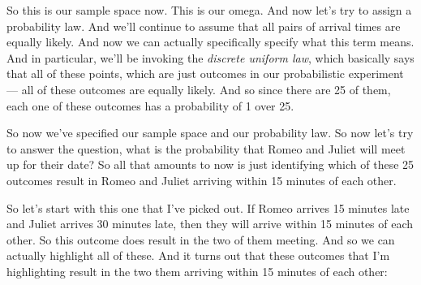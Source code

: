 \documentclass[pdftex, brazil, 12pt, twoside]{article}
\begin{document}
\begin{figure}[H]
  \begin{center}
  \end{center}
\end{figure}

So this is our sample space now.
This is our omega.
And now let's try to assign a probability law.
And we'll continue to assume that all pairs of arrival 
times are equally likely.
And now we can actually specifically specify what this
term means.
And in particular, we'll be invoking the \emph{discrete uniform
law}, which basically says that all of these points, which are
just outcomes in our probabilistic experiment ---
all of these outcomes are equally likely.
And so since there are 25 of them, each one of these
outcomes has a probability of 1 over 25.

So now we've specified our sample space and our
probability law.
So now let's try to answer the question, what is the
probability that Romeo and Juliet will meet
up for their date?
So all that amounts to now is just identifying which of
these 25 outcomes result in Romeo and Juliet arriving
within 15 minutes of each other.

So let's start with this one that I've picked out.
If Romeo arrives 15 minutes late and Juliet arrives 30
minutes late, then they will arrive within 15 minutes of
each other.
So this outcome does result in the two of them meeting.
And so we can actually highlight all of these.
And it turns out that these outcomes that I'm highlighting
result in the two them arriving within 15 minutes of
each other:

\begin{figure}[H]
  \begin{center}
  \end{center}
\end{figure}
\end{document}
